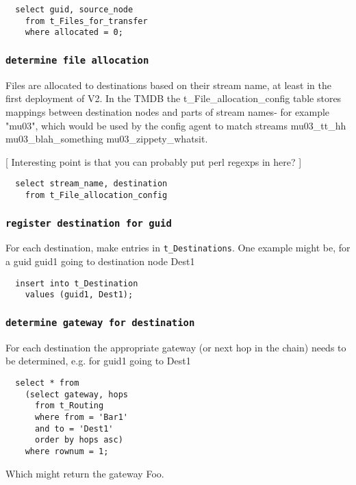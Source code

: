 \documentclass{cmspaper}
\begin{document}
{\small\begin{verbatim}
  select guid, source_node
    from t_Files_for_transfer
    where allocated = 0;
\end{verbatim}}

\subsubsection{\textbf{\texttt{determine file allocation}}}
Files are allocated to destinations based on their stream name, at least in the first deployment of V2. In the TMDB the t\_File\_allocation\_config table stores mappings between destination nodes and parts of stream names- for example "mu03", which would be used by the config agent to match streams mu03\_tt\_hh mu03\_blah\_something mu03\_zippety\_whatsit.

[ Interesting point is that you can probably put perl regexps in here? ]

{\small\begin{verbatim}
  select stream_name, destination
    from t_File_allocation_config
\end{verbatim}}

\subsubsection{\textbf{\texttt{register destination for guid}}}
For each destination, make entries in \texttt{t\_Destinations}. One example might be, for a guid guid1 going to destination node Dest1

{\small\begin{verbatim}
  insert into t_Destination
    values (guid1, Dest1);
\end{verbatim}}

\subsubsection{\textbf{\texttt{determine gateway for destination}}}
For each destination the appropriate gateway (or next hop in the chain) needs to be determined, e.g. for guid1 going to Dest1

{\small\begin{verbatim}
  select * from
    (select gateway, hops
      from t_Routing
      where from = 'Bar1'
      and to = 'Dest1'
      order by hops asc)
    where rownum = 1;
\end{verbatim}}

Which might return the gateway Foo. 
\end{document}
